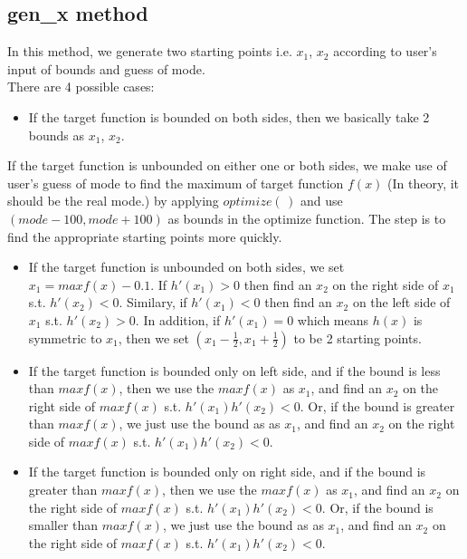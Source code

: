 \documentclass[11pt, oneside]{article}   	%
\begin{document}
\subsection*{ gen\_x method }
In this method, we generate two starting points i.e. $x_{1}$, $x_{2}$ according to user's input of bounds and guess of mode. \\
There are 4 possible cases:
  \begin{itemize}
  \item  If the target function is bounded on both sides, then we basically take 2 bounds as $x_{1}$, $x_{2}$.
 \end{itemize}
If the target function is unbounded on either one or both sides, we make use of user's guess of mode to find the maximum of target function $f(x)$ (In theory, it should be the real mode.) by applying $optimize(\,)$ and use $(mode-100, mode+100)$ as bounds in the optimize function. The step is to find the appropriate starting points more quickly.


 \begin{itemize}

  \item  If the target function is unbounded on both sides,  we set $x_{1}=maxf(x)-0.1$. If $h'(x_{1})>0$ then find an $x_{2}$ on the right side of $x_{1}$ s.t. $h'(x_{2})<0$. Similary, if $h'(x_{1})<0$ then find an $x_{2}$ on the left side of $x_{1}$ s.t. $h'(x_{2})>0$. In addition, if $h'(x_{1})=0$ which means $h(x)$ is symmetric to $x_{1}$, then we set $(x_{1}-\frac{1}{2},x_{1}+\frac{1}{2})$ to be 2 starting points.


  \item  If the target function is bounded only on left side,  and if the bound is less than $maxf(x)$, then we use the $maxf(x)$ as $x_{1}$, and find an $x_{2}$ on the right side of $maxf(x)$ s.t. $h'(x_{1})h'(x_{2})<0$. Or, if the bound is greater than $maxf(x)$, we just use the bound as as $x_{1}$, and find an $x_{2}$ on the right side of $maxf(x)$ s.t. $h'(x_{1})h'(x_{2})<0$.

  \item  If the target function is bounded only on right side,  and if the bound is greater than $maxf(x)$, then we use the $maxf(x)$ as $x_{1}$, and find an $x_{2}$ on the right side of $maxf(x)$ s.t. $h'(x_{1})h'(x_{2})<0$. Or, if the bound is smaller than $maxf(x)$, we just use the bound as as $x_{1}$, and find an $x_{2}$ on the right side of $maxf(x)$ s.t. $h'(x_{1})h'(x_{2})<0$.

 \end{itemize}
\end{document}
